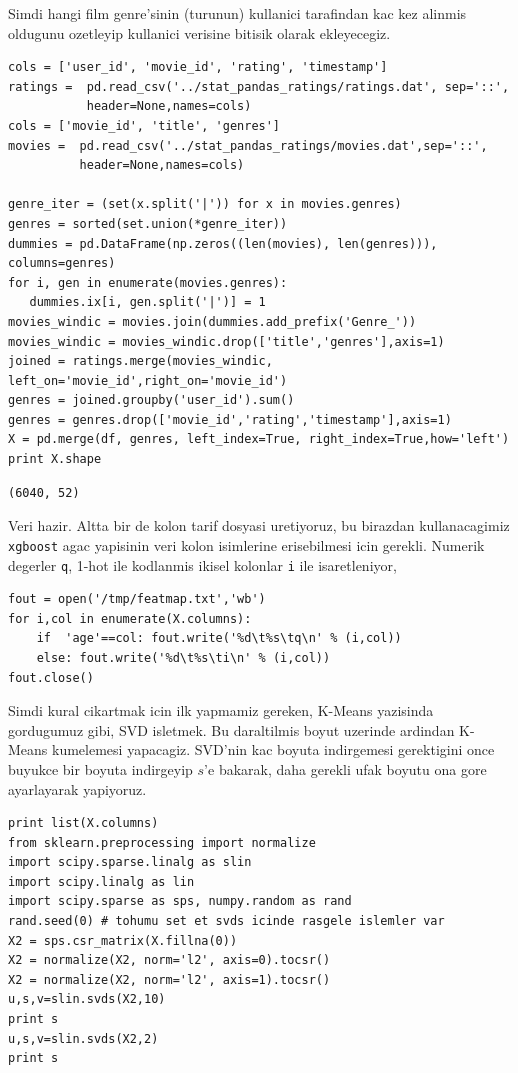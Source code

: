 \documentclass[12pt,fleqn]{article}\usepackage{../common}
\begin{document}
Simdi hangi film genre'sinin (turunun) kullanici tarafindan kac kez alinmis
oldugunu ozetleyip kullanici verisine bitisik olarak ekleyecegiz. 

\begin{verbatim}
cols = ['user_id', 'movie_id', 'rating', 'timestamp']
ratings =  pd.read_csv('../stat_pandas_ratings/ratings.dat', sep='::',
           header=None,names=cols)
cols = ['movie_id', 'title', 'genres']
movies =  pd.read_csv('../stat_pandas_ratings/movies.dat',sep='::',
          header=None,names=cols)

genre_iter = (set(x.split('|')) for x in movies.genres)
genres = sorted(set.union(*genre_iter))
dummies = pd.DataFrame(np.zeros((len(movies), len(genres))), columns=genres)
for i, gen in enumerate(movies.genres):
   dummies.ix[i, gen.split('|')] = 1
movies_windic = movies.join(dummies.add_prefix('Genre_'))
movies_windic = movies_windic.drop(['title','genres'],axis=1)
joined = ratings.merge(movies_windic, left_on='movie_id',right_on='movie_id')
genres = joined.groupby('user_id').sum()
genres = genres.drop(['movie_id','rating','timestamp'],axis=1)
X = pd.merge(df, genres, left_index=True, right_index=True,how='left')
print X.shape
\end{verbatim}

\begin{verbatim}
(6040, 52)
\end{verbatim}

Veri hazir. Altta bir de kolon tarif dosyasi uretiyoruz, bu birazdan
kullanacagimiz \verb!xgboost! agac yapisinin veri kolon isimlerine
erisebilmesi icin gerekli. Numerik degerler \verb!q!, 1-hot ile
kodlanmis ikisel kolonlar \verb!i! ile isaretleniyor,

\begin{verbatim}
fout = open('/tmp/featmap.txt','wb')
for i,col in enumerate(X.columns):
    if  'age'==col: fout.write('%d\t%s\tq\n' % (i,col))
    else: fout.write('%d\t%s\ti\n' % (i,col))    
fout.close()
\end{verbatim}

Simdi kural cikartmak icin ilk yapmamiz gereken, K-Means yazisinda
gordugumuz gibi, SVD isletmek. Bu daraltilmis boyut uzerinde ardindan
K-Means kumelemesi yapacagiz. SVD'nin kac boyuta indirgemesi gerektigini
once buyukce bir boyuta indirgeyip $s$'e bakarak, daha gerekli ufak boyutu
ona gore ayarlayarak yapiyoruz.

\begin{verbatim}
print list(X.columns)
from sklearn.preprocessing import normalize
import scipy.sparse.linalg as slin
import scipy.linalg as lin
import scipy.sparse as sps, numpy.random as rand
rand.seed(0) # tohumu set et svds icinde rasgele islemler var
X2 = sps.csr_matrix(X.fillna(0))
X2 = normalize(X2, norm='l2', axis=0).tocsr()
X2 = normalize(X2, norm='l2', axis=1).tocsr()    
u,s,v=slin.svds(X2,10)
print s
u,s,v=slin.svds(X2,2)
print s
\end{verbatim}
\end{document}
